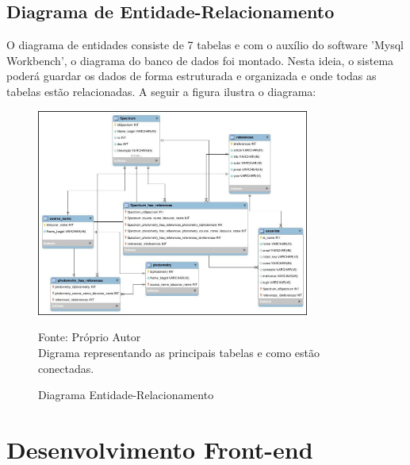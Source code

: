 \subsection{Diagrama de Entidade-Relacionamento}

O diagrama de entidades consiste de 7 tabelas e com o auxílio do software 'Mysql Workbench', o diagrama do banco de dados foi montado. Nesta ideia, o sistema poderá guardar os dados de forma estruturada e organizada e onde todas as tabelas estão relacionadas.
A seguir a figura ilustra o diagrama:

\begin{figure}[H]
	\centering	
    \caption{Diagrama Entidade-Relacionamento}
    \includegraphics[width=0.8\textwidth]{figuras/modelo_er_latex.jpg}
   	\begin{center}
        \normalsize Fonte: Próprio Autor \\Digrama representando as principais tabelas e como estão conectadas.
    \end{center}
	\label{fig:sbmt-moses}
\end{figure}

\section{Desenvolvimento Front-end}

